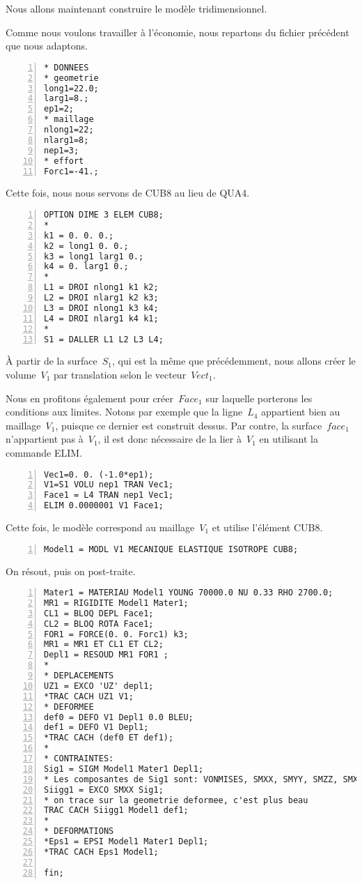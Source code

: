 Nous allons maintenant construire le modèle tridimensionnel.

Comme nous voulons travailler à l'économie, nous repartons du fichier précédent que nous adaptons.

\begin{Verbatim}[numbers=left,numbersep=3pt]
* DONNEES
* geometrie
long1=22.0;
larg1=8.;
ep1=2;
* maillage
nlong1=22;
nlarg1=8;
nep1=3;
* effort
Forc1=-41.;
\end{Verbatim}

\medskip
Cette fois, nous nous servons de CUB8 au lieu de QUA4.

\begin{Verbatim}[numbers=left,numbersep=3pt,firstnumber=last]
OPTION DIME 3 ELEM CUB8;
*
k1 = 0. 0. 0.;
k2 = long1 0. 0.;
k3 = long1 larg1 0.;
k4 = 0. larg1 0.;
*
L1 = DROI nlong1 k1 k2;
L2 = DROI nlarg1 k2 k3;
L3 = DROI nlong1 k3 k4;
L4 = DROI nlarg1 k4 k1;
*
S1 = DALLER L1 L2 L3 L4;
\end{Verbatim}

\medskip
À partir de la surface~$S_1$, qui est la même que précédemment, nous allons créer le volume~$V_1$ par translation
selon le vecteur~$Vect_1$.

Nous en profitons également pour créer~$Face_1$ sur laquelle porterons les conditions aux limites.
Notons par exemple que la ligne~$L_4$ appartient bien au maillage~$V_1$, puisque ce dernier est construit dessus.
Par contre, la surface~$face_1$ n'appartient pas à~$V_1$, il est donc nécessaire de la lier à~$V_1$ en utilisant
la commande ELIM.

\begin{Verbatim}[numbers=left,numbersep=3pt,firstnumber=last]
Vec1=0. 0. (-1.0*ep1);
V1=S1 VOLU nep1 TRAN Vec1;
Face1 = L4 TRAN nep1 Vec1;
ELIM 0.0000001 V1 Face1;
\end{Verbatim}

\medskip
Cette fois, le modèle correspond au maillage~$V_1$ et utilise l'élément CUB8.

\begin{Verbatim}[numbers=left,numbersep=3pt,firstnumber=last]
Model1 = MODL V1 MECANIQUE ELASTIQUE ISOTROPE CUB8;
\end{Verbatim}

\medskip
On résout, puis on post-traite.

\begin{Verbatim}[numbers=left,numbersep=3pt,firstnumber=last]
Mater1 = MATERIAU Model1 YOUNG 70000.0 NU 0.33 RHO 2700.0;
MR1 = RIGIDITE Model1 Mater1;
CL1 = BLOQ DEPL Face1;
CL2 = BLOQ ROTA Face1;
FOR1 = FORCE(0. 0. Forc1) k3;
MR1 = MR1 ET CL1 ET CL2;
Depl1 = RESOUD MR1 FOR1 ;
*
* DEPLACEMENTS
UZ1 = EXCO 'UZ' depl1;
*TRAC CACH UZ1 V1;
* DEFORMEE
def0 = DEFO V1 Depl1 0.0 BLEU;
def1 = DEFO V1 Depl1;
*TRAC CACH (def0 ET def1);
*
* CONTRAINTES: 
Sig1 = SIGM Model1 Mater1 Depl1;
* Les composantes de Sig1 sont: VONMISES, SMXX, SMYY, SMZZ, SMXY, SMXZ, SMYZ
Siigg1 = EXCO SMXX Sig1;
* on trace sur la geometrie deformee, c'est plus beau
TRAC CACH Siigg1 Model1 def1;
*
* DEFORMATIONS
*Eps1 = EPSI Model1 Mater1 Depl1;
*TRAC CACH Eps1 Model1;

fin;
\end{Verbatim}
